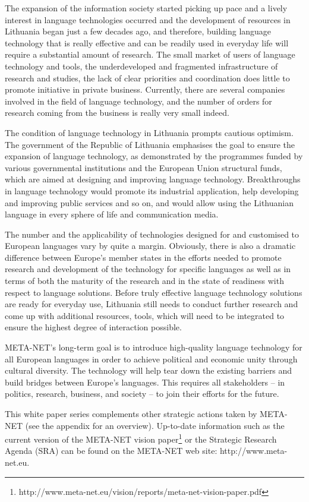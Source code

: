 \begin{multicols}{2}
The expansion of the information society started picking up pace and a lively interest in language technologies occurred and the development of resources in Lithuania began just a few decades ago, and therefore, building language technology that is really effective and can be readily used in everyday life will require a substantial amount of research. The small market of users of language technology and tools, the underdeveloped and fragmented infrastructure of research and studies, the lack of clear priorities and coordination does little to promote initiative in private business. Currently, there are several companies involved in the field of language technology, and the number of orders for research coming from the business is really very small indeed.

The condition of language technology in Lithuania prompts cautious optimism. The government of the Republic of Lithuania emphasises the goal to ensure the expansion of language technology, as demonstrated by the programmes funded by various governmental institutions and the European Union structural funds, which are aimed at designing and improving language technology. Breakthroughs in language technology would promote its industrial application, help developing and improving public services and so on, and would allow using the Lithuanian language in every sphere of life and communication media.


The number and the applicability of technologies designed for and customised to European languages vary by quite a margin. Obviously, there is also a dramatic difference between Europe’s member states in the efforts needed to promote research and development of the technology for specific languages as well as in terms of both the maturity of the research and in the state of readiness with respect to language solutions. Before truly effective language technology solutions are ready for everyday use, Lithuania still needs to conduct further research and come up with additional resources, tools, which will need to be integrated to ensure the highest degree of interaction possible.

META-NET’s long-term goal is to introduce high-quality language technology for all European languages in order to achieve political and economic unity through cultural diversity. The technology will help tear down the existing barriers and build bridges between Europe’s languages. This requires all stakeholders – in politics, research, business, and society – to join their efforts for the future.

This white paper series complements other strategic actions taken by META-NET (see the appendix for an overview). Up-to-date information such as the current version of the META-NET vision paper\footnote{http://www.meta-net.eu/vision/reports/meta-net-vision-paper.pdf} or the Strategic Research Agenda (SRA) can be found on the META-NET web site: http://www.meta-net.eu.
\end{multicols}

